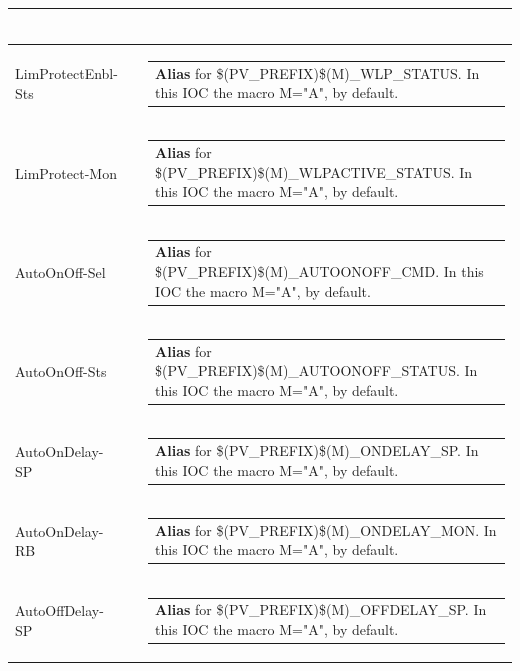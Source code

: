 \documentclass[openany]{article}
\begin{document}
\begin{longtable}{| m{4.5cm} m{2.5cm}  m{8.0cm} |}
\begin{tabular}{@{}m{6cm}@{}}
            \end{tabular} \hypertarget{}{}\\ \hline
        LimProtectEnbl-Sts &  & \begin{tabular}{@{}m{6cm}@{}}
                \textbf{Alias} for \$(PV\_PREFIX)\$(M)\_WLP\_STATUS. In this IOC the macro M="A", by default.
            \end{tabular} \hypertarget{}{}\\ \hline
        LimProtect-Mon &  & \begin{tabular}{@{}m{6cm}@{}}
                \textbf{Alias} for \$(PV\_PREFIX)\$(M)\_WLPACTIVE\_STATUS. In this IOC the macro M="A", by default.
            \end{tabular} \hypertarget{}{}\\ \hline
        AutoOnOff-Sel &  & \begin{tabular}{@{}m{6cm}@{}}
                \textbf{Alias} for \$(PV\_PREFIX)\$(M)\_AUTOONOFF\_CMD. In this IOC the macro M="A", by default.
            \end{tabular} \hypertarget{}{}\\ \hline
        AutoOnOff-Sts &  & \begin{tabular}{@{}m{6cm}@{}}
                \textbf{Alias} for \$(PV\_PREFIX)\$(M)\_AUTOONOFF\_STATUS. In this IOC the macro M="A", by default.
            \end{tabular} \hypertarget{}{}\\ \hline
        AutoOnDelay-SP &  & \begin{tabular}{@{}m{6cm}@{}}
                \textbf{Alias} for \$(PV\_PREFIX)\$(M)\_ONDELAY\_SP. In this IOC the macro M="A", by default.
            \end{tabular} \hypertarget{}{}\\ \hline
        AutoOnDelay-RB &  & \begin{tabular}{@{}m{6cm}@{}}
                \textbf{Alias} for \$(PV\_PREFIX)\$(M)\_ONDELAY\_MON. In this IOC the macro M="A", by default.
            \end{tabular} \hypertarget{}{}\\ \hline
        AutoOffDelay-SP &  & \begin{tabular}{@{}m{6cm}@{}}
                \textbf{Alias} for \$(PV\_PREFIX)\$(M)\_OFFDELAY\_SP. In this IOC the macro M="A", by default.
            \end{tabular} \hypertarget{}{}\\ \hline

\end{longtable}
\end{document}
